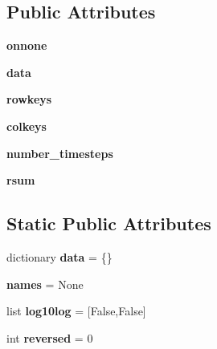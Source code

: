 \subsection*{Public Attributes}
\begin{DoxyCompactItemize}
\item 
\mbox{\label{classdsmacc_1_1graph_1_1STPR_1_1Sparse3D_a69b759f2bfb90891898f3a42741b0190}} 
{\bfseries onnone}
\item 
\mbox{\label{classdsmacc_1_1graph_1_1STPR_1_1Sparse3D_abc0cbe697a988fce9ce42c04cbf615fa}} 
{\bfseries data}
\item 
\mbox{\label{classdsmacc_1_1graph_1_1STPR_1_1Sparse3D_a14d035db37ee89590690ce0ba04e1853}} 
{\bfseries rowkeys}
\item 
\mbox{\label{classdsmacc_1_1graph_1_1STPR_1_1Sparse3D_a87596173f0bf27d72f124af0e7b60488}} 
{\bfseries colkeys}
\item 
\mbox{\label{classdsmacc_1_1graph_1_1STPR_1_1Sparse3D_a056abb1a0463df708e3087bd70f94391}} 
{\bfseries number\+\_\+timesteps}
\item 
\mbox{\label{classdsmacc_1_1graph_1_1STPR_1_1Sparse3D_ae9c00e135e6bb147958deabb84280f55}} 
{\bfseries rsum}
\end{DoxyCompactItemize}
\subsection*{Static Public Attributes}
\begin{DoxyCompactItemize}
\item 
\mbox{\label{classdsmacc_1_1graph_1_1STPR_1_1Sparse3D_a6f18a03dc128756c337bb50b2fa752c9}} 
dictionary {\bfseries data} = \{\}
\item 
\mbox{\label{classdsmacc_1_1graph_1_1STPR_1_1Sparse3D_a2225c4c513264d7642f46a81e0221de3}} 
{\bfseries names} = None
\item 
\mbox{\label{classdsmacc_1_1graph_1_1STPR_1_1Sparse3D_a5b2afcaf087e5b86b8d02afa40164a9e}} 
list {\bfseries log10log} = \mbox{[}False,False\mbox{]}
\item 
\mbox{\label{classdsmacc_1_1graph_1_1STPR_1_1Sparse3D_aeee89db18d1dc8e3a17e5117d9a12e6f}} 
int {\bfseries reversed} = 0
\end{DoxyCompactItemize}


